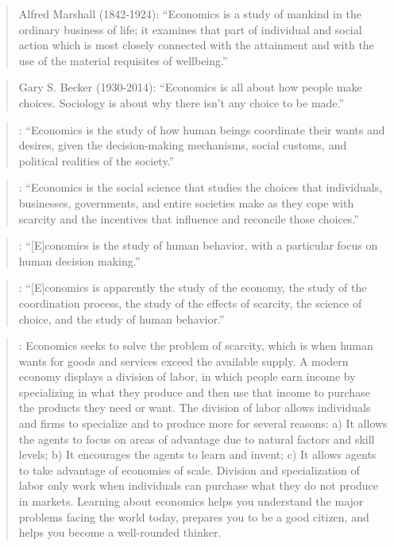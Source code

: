 \documentclass[
  12pt,
  oneside]{book}
\theoremstyle{definition}
\theoremstyle{definition}
\theoremstyle{definition}
\theoremstyle{definition}
\theoremstyle{remark}
\begin{document}
\begin{quote}
Alfred Marshall (1842-1924): ``Economics is a study of mankind in the ordinary business of life; it examines that part of individual and social action which is most closely connected with the attainment and with the use of the material requisites of wellbeing.'' \citet[p.~1]{Marshall2009Principles}
\end{quote}

\begin{quote}
Gary S. Becker (1930-2014): ``Economics is all about how people make choices. Sociology is about why there isn't any choice to be made.'' \citet[p.~233]{Becker1960Economic}
\end{quote}

\begin{quote}
\citet[p.~4]{Colander2006Economics}: ``Economics is the study of how human beings coordinate their wants and desires, given the decision-making mechanisms, social customs, and political realities of the society.''
\end{quote}

\begin{quote}
\citet[p.~2]{Parkin2012Economics}: ``Economics is the social science that studies the choices that individuals, businesses, governments, and entire societies make as they cope with scarcity and the incentives that influence and reconcile those choices.''
\end{quote}

\begin{quote}
\citet[p.~5.]{Gwartney2006Microeconomics}: ``{[}E{]}conomics is the study of human behavior, with a particular focus on human decision making.''
\end{quote}

\begin{quote}
\citet[p.~222]{Backhouse2009Retrospectives}: ``{[}E{]}conomics is apparently the study of the economy, the study of the coordination process, the study of the effects of scarcity, the science of choice, and the study of human behavior.''
\end{quote}

\begin{quote}
\citet[ch.~1]{Greenlaw2022Principles}: Economics seeks to solve the problem of scarcity, which is when human wants for goods and services exceed the available supply. A modern economy displays a division of labor, in which people earn income by specializing in what they produce and then use that income to purchase the products they need or want. The division of labor allows individuals and firms to specialize and to produce more for several reasons: a) It allows the agents to focus on areas of advantage due to natural factors and skill levels; b) It encourages the agents to learn and invent; c) It allows agents to take advantage of economies of scale. Division and specialization of labor only work when individuals can purchase what they do not produce in markets. Learning about economics helps you understand the major problems facing the world today, prepares you to be a good citizen, and helps you become a well-rounded thinker.
\end{quote}
\end{document}
